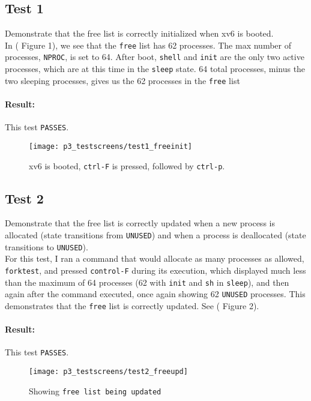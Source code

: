 \documentclass[11pt,letterpaper]{report}
\begin{document}
 	\subsection{Test 1}
 	Demonstrate that the free list is correctly initialized when xv6 is booted.\\
 	
 	In ({\color{red} Figure 1}), we see that the {\tt free} list has 62 processes. The max number of processes, {\tt NPROC}, is set to 64. After boot, {\tt shell} and {\tt init} are the only two active processes, which are at this time in the {\tt sleep} state. 64 total processes, minus the two sleeping processes, gives us the 62 processes in the {\tt free} list
 	
 	\paragraph{Result:} This test {\tt PASSES}.
 	
 	
\begin{figure}
	\centering
	\texttt{[image: p3\_testscreens/test1\_freeinit]}
	\caption{xv6 is booted, {\tt ctrl-F} is pressed, followed by {\tt ctrl-p}.}
	\label{fig:test1freeinit}
\end{figure}
 	
 	\subsection{Test 2}
 	Demonstrate that the free list is correctly updated when a new process is allocated (state transitions from {\tt UNUSED}) and when a process is deallocated (state transitions to {\tt UNUSED}).\\
 	
 	For this test, I ran a command that would allocate as many processes as allowed, {\tt forktest}, and pressed {\tt control-F} during its execution, which displayed much less than the maximum of 64 processes (62 with {\tt init} and {\tt sh} in {\tt sleep}), and then again after the command executed, once again showing 62 {\tt UNUSED} processes. This demonstrates that the {\tt free} list is correctly updated. See ({\color{red} Figure 2}).
 	
 	\paragraph{Result:} This test {\tt PASSES}.
 	
\begin{figure}
	\centering
	\texttt{[image: p3\_testscreens/test2\_freeupd]}
	\caption{Showing {\tt free list being updated}}
	\label{fig:test2freeupd}
\end{figure}
 	
\end{document}
